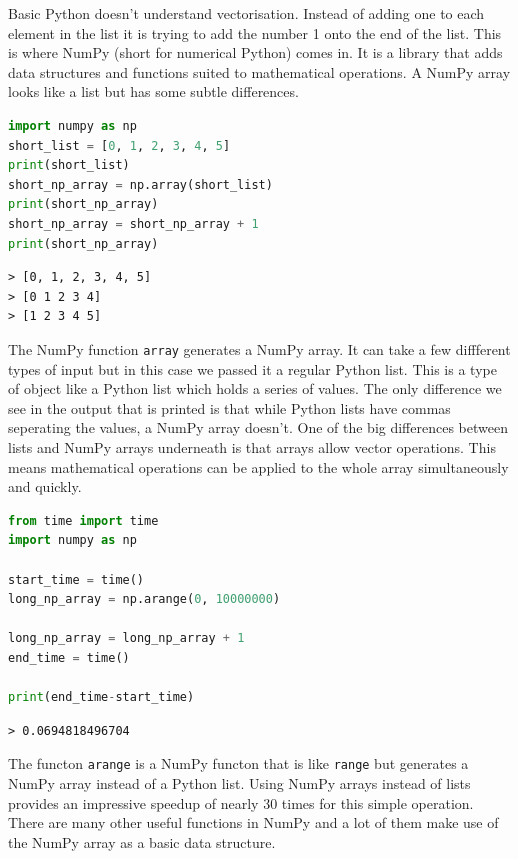 	Basic Python doesn't understand vectorisation. Instead of adding one to each element in the list it is trying to add the number 1 onto the end of the list. This is where NumPy (short for numerical Python) comes in. It is a library that adds data structures and functions suited to mathematical operations. A NumPy array looks like a list but has some subtle differences.

	\begin{lstlisting}[language=Python]
import numpy as np
short_list = [0, 1, 2, 3, 4, 5]
print(short_list)
short_np_array = np.array(short_list)
print(short_np_array)
short_np_array = short_np_array + 1
print(short_np_array)\end{lstlisting}

	\begin{verbatim}
> [0, 1, 2, 3, 4, 5]
> [0 1 2 3 4]
> [1 2 3 4 5]
	\end{verbatim}

	The NumPy function \texttt{array} generates a NumPy array. It can take a few diffferent types of input but in this case we passed it a regular Python list. This is a type of object like a Python list which holds a series of values. The only difference we see in the output that is printed is that while Python lists have commas seperating the values, a NumPy array doesn't. One of the big differences between lists and NumPy arrays underneath is that arrays allow vector operations. This means mathematical operations can be applied to the whole array simultaneously and quickly.

	\begin{lstlisting}[language=Python]
from time import time
import numpy as np

start_time = time()
long_np_array = np.arange(0, 10000000)

long_np_array = long_np_array + 1
end_time = time()

print(end_time-start_time)\end{lstlisting}
	\begin{verbatim}
> 0.0694818496704 \end{verbatim}

	The functon \texttt{arange} is a NumPy functon that is like \texttt{range} but generates a NumPy array instead of a Python list. Using NumPy arrays instead of lists provides an impressive speedup of nearly 30 times for this simple operation. There are many other useful functions in NumPy and a lot of them make use of the NumPy array as a basic data structure.

